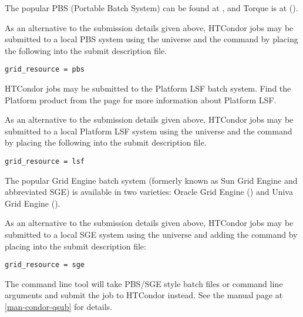 
The popular PBS (Portable Batch System) can be found at
,
and Torque is at
().

As an alternative to the submission details given above,
HTCondor jobs may be submitted to a local PBS system
using the  universe and the
 command by placing the following
into the submit description file.
\begin{verbatim}
grid_resource = pbs
\end{verbatim}




HTCondor jobs may be submitted to the Platform LSF batch system.
Find the Platform product from the page
for more information about Platform LSF.

As an alternative to the submission details given above,
HTCondor jobs may be submitted to a local Platform LSF system
using the  universe and the
 command  by placing the following
into the submit description file.
\begin{verbatim}
grid_resource = lsf
\end{verbatim}




The popular Grid Engine batch system (formerly known as Sun Grid Engine and
abbreviated SGE) is available in two varieties:
Oracle Grid Engine
()
and Univa Grid Engine
().

As an alternative to the submission details given above,
HTCondor jobs may be submitted to a local SGE system
using the  universe and adding the
 command by placing
into the submit description file:
\begin{verbatim}
grid_resource = sge
\end{verbatim}


The  command line tool will take PBS/SGE style batch files or 
command line arguments and submit the job to HTCondor instead.
See the  manual page at \ref{man-condor-qsub} for details.

